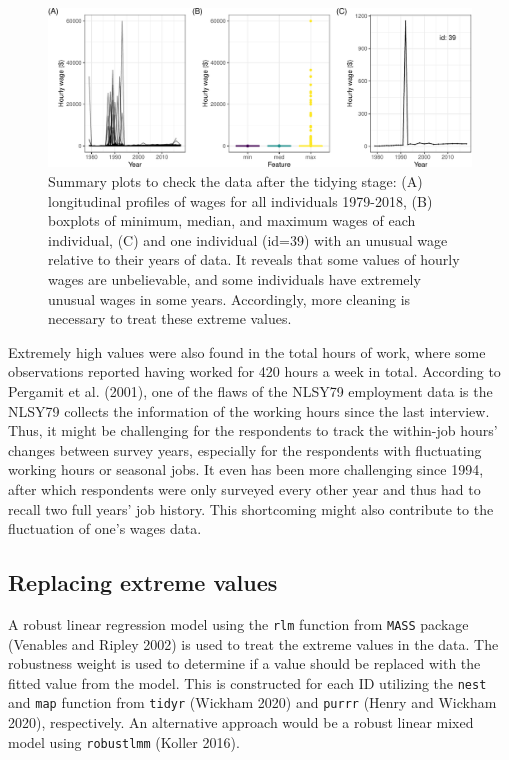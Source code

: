 \documentclass[12pt]{article}
\begin{document}
\begin{figure}

{\centering \includegraphics[width=1\linewidth]{figures/feature-plot-1} 

}

\caption{Summary plots to check the data after the tidying stage: (A) longitudinal profiles of wages for all individuals 1979-2018, (B) boxplots of minimum, median, and maximum wages of each individual, (C) and one individual (id=39) with an unusual wage relative to their years of data. It reveals that some values of hourly wages are unbelievable, and some individuals have extremely unusual wages in some years. Accordingly, more cleaning is necessary to treat these extreme values.}\label{fig:feature-plot}
\end{figure}

Extremely high values were also found in the total hours of work, where some observations reported having worked for 420 hours a week in total. According to Pergamit et al. (2001), one of the flaws of the NLSY79 employment data is the NLSY79 collects the information of the working hours since the last interview. Thus, it might be challenging for the respondents to track the within-job hours' changes between survey years, especially for the respondents with fluctuating working hours or seasonal jobs. It even has been more challenging since 1994, after which respondents were only surveyed every other year and thus had to recall two full years' job history. This shortcoming might also contribute to the fluctuation of one's wages data.

\hypertarget{censor}{%
\subsection{Replacing extreme values}\label{censor}}

A robust linear regression model using the \texttt{rlm} function from \texttt{MASS} package (Venables and Ripley 2002) is used to treat the extreme values in the data. The robustness weight is used to determine if a value should be replaced with the fitted value from the model. This is constructed for each ID utilizing the \texttt{nest} and \texttt{map} function from \texttt{tidyr} (Wickham 2020) and \texttt{purrr} (Henry and Wickham 2020), respectively. An alternative approach would be a robust linear mixed model using \texttt{robustlmm} (Koller 2016).
\end{document}
